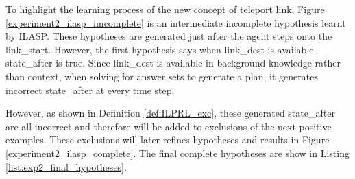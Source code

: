 
To highlight the learning process of the new concept of teleport link, Figure \ref{experiment2_ilasp_imcomplete} is an intermediate incomplete hypothesis learnt by ILASP.
These hypotheses are generated just after the agent steps onto the \textsf{link\_start}. However, the first hypothesis says
when link\_dest is available state\_after is true. Since link\_dest is available in background knowledge rather than context,
when solving for answer sets to generate a plan, it generates incorrect state\_after at every time step.

However, as shown in Definition \ref{def:ILPRL_exc}, these generated state\_after are all incorrect and therefore will be added to exclusions of the next positive examples.
These exclusions will later refines hypotheses and results in Figure \ref{experiment2_ilasp_complete}.
The final complete hypotheses are show in Listing \ref{list:exp2_final_hypotheses}.



